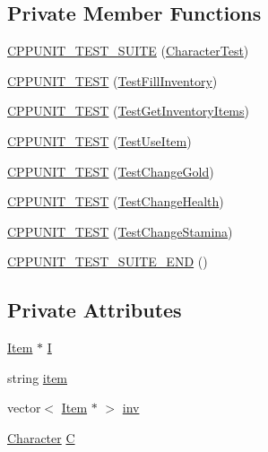 \subsection*{Private Member Functions}
\begin{DoxyCompactItemize}
\item 
\hyperlink{classCharacterTest_a9882f04c10eedb154b93bdeb19144182}{C\-P\-P\-U\-N\-I\-T\-\_\-\-T\-E\-S\-T\-\_\-\-S\-U\-I\-T\-E} (\hyperlink{classCharacterTest}{Character\-Test})
\item 
\hyperlink{classCharacterTest_ac9e2e2e32564afe8b256b4fd0b0e1867}{C\-P\-P\-U\-N\-I\-T\-\_\-\-T\-E\-S\-T} (\hyperlink{classCharacterTest_a348e663ab1846bbe64770dfd437bea49}{Test\-Fill\-Inventory})
\item 
\hyperlink{classCharacterTest_ab86d157d42dcc5acbda6e67308fa879a}{C\-P\-P\-U\-N\-I\-T\-\_\-\-T\-E\-S\-T} (\hyperlink{classCharacterTest_a0fae073fe364d5bb09e1488505f2f247}{Test\-Get\-Inventory\-Items})
\item 
\hyperlink{classCharacterTest_ae07c31a496c77343ff1afe5d6666619a}{C\-P\-P\-U\-N\-I\-T\-\_\-\-T\-E\-S\-T} (\hyperlink{classCharacterTest_a6510093a5bfccb8d325e00e0a15a81c2}{Test\-Use\-Item})
\item 
\hyperlink{classCharacterTest_ab8d48b1d88ca6958c7a702f6788e9b91}{C\-P\-P\-U\-N\-I\-T\-\_\-\-T\-E\-S\-T} (\hyperlink{classCharacterTest_a318991be56057b2587fcf357e13409ab}{Test\-Change\-Gold})
\item 
\hyperlink{classCharacterTest_a06162254e38a314ea52101a2e3f6271f}{C\-P\-P\-U\-N\-I\-T\-\_\-\-T\-E\-S\-T} (\hyperlink{classCharacterTest_a1e3ff758e3a47589ac31297cf62db9c4}{Test\-Change\-Health})
\item 
\hyperlink{classCharacterTest_ada430d4138cf07e076b4288602d425b8}{C\-P\-P\-U\-N\-I\-T\-\_\-\-T\-E\-S\-T} (\hyperlink{classCharacterTest_ac61fb4a8c3c9b4a3f1d8e70856d4c9e0}{Test\-Change\-Stamina})
\item 
\hyperlink{classCharacterTest_acbb1bb277e098afa5ba3ea70c3204a41}{C\-P\-P\-U\-N\-I\-T\-\_\-\-T\-E\-S\-T\-\_\-\-S\-U\-I\-T\-E\-\_\-\-E\-N\-D} ()
\end{DoxyCompactItemize}
\subsection*{Private Attributes}
\begin{DoxyCompactItemize}
\item 
\hyperlink{classItem}{Item} $\ast$ \hyperlink{classCharacterTest_ae1a2e151fc3a843b36e3ae24b7661fb4}{I}
\item 
string \hyperlink{classCharacterTest_aee8b109b66e2f22ba5de6abaaba47160}{item}
\item 
vector$<$ \hyperlink{classItem}{Item} $\ast$ $>$ \hyperlink{classCharacterTest_a23af9da0d443fb16273ed269b8a91e8b}{inv}
\item 
\hyperlink{classCharacter}{Character} \hyperlink{classCharacterTest_a2afd29afdeb90cbac6ac18a71ef7e23a}{C}
\end{DoxyCompactItemize}



